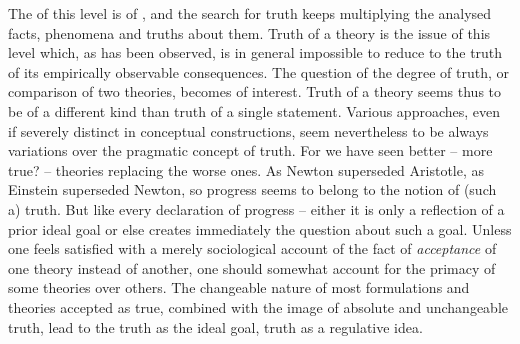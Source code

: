 \pa The  of this level is  of
, and the search for truth keeps multiplying the analysed facts,
phenomena and truths about them.  Truth of a theory is the issue of this level
which, as has been observed, is in general impossible to reduce to the truth of
its empirically observable consequences. The question of the degree of truth, or
comparison of two theories, becomes of interest. Truth of a theory
seems thus to be of a different kind than truth of a single statement.  Various
approaches, even if severely distinct in conceptual constructions, seem
nevertheless to be always variations over the pragmatic concept of truth. For we
have seen better -- more true? -- theories replacing the worse ones.  As Newton
superseded Aristotle, as Einstein superseded Newton, so progress seems to
belong to the notion of (such a) truth. But like every declaration of progress
-- either it is only a reflection of a prior ideal goal or else creates
immediately the question about such a goal.  Unless one feels satisfied with a
merely sociological account of the fact of {\em acceptance} of one theory
instead of another, one should somewhat account for the primacy
of some theories over others.
The changeable nature of most formulations and theories accepted as true,
combined with the image of absolute and unchangeable truth, lead to the truth as
the  ideal goal, truth as a regulative idea.

